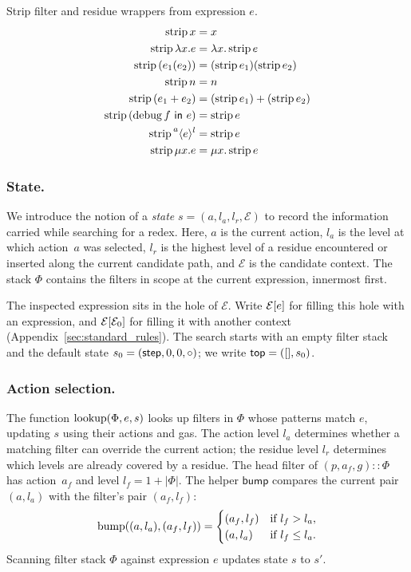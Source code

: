  Strip filter and residue wrappers from expression \(e\).
\[
  \begin{aligned}
    \Strip{x} &= x \\
    \Strip{\Lam{x}{e}} &= \Lam{x}{\Strip{e}} \\
    \Strip{(e_1(e_2))} &= (\Strip{e_1})(\Strip{e_2}) \\
    \Strip{\Nat{n}} &= \Nat{n} \\
    \Strip{(e_1 + e_2)} &= (\Strip{e_1}) + (\Strip{e_2}) \\
    \Strip{(\Filter{f}{e})} &= \Strip{e} \\
    \Strip{\Residue{a}{l}{e}} &= \Strip{e} \\
    \Strip{\Fix{x}{e}} &= \Fix{x}{\Strip{e}}
  \end{aligned}
\]

\subsubsection{State.} We introduce the notion of a \emph{state}
\(s=(a,l_a,l_r,\mathcal{E})\) to record the information carried
while searching for a redex. Here, \(a\) is the current
action, \(l_a\) is the level at which action~\(a\) was selected,
\(l_r\) is the highest level of a residue encountered or inserted
along the current candidate path, and \(\mathcal{E}\) is the
candidate context. The stack \(\Phi\) contains the filters in scope
at the current expression, innermost first.

The inspected expression sits in the hole of \(\mathcal{E}\).
Write \(\Plug{\mathcal{E}}{e}\) for filling this hole with an
expression, and \(\Plug{\mathcal{E}}{\mathcal{E}_0}\) for filling
it with another context (Appendix~\ref{sec:standard_rules}). The
search starts with an empty filter stack and the default state
\(s_0=(\ActStep,0,0,\Mark)\); we write
\(\TopState=([],s_0)\).

\subsubsection{Action selection.} The function
\(\Lookup{\Phi}{e}{s}\) looks up filters in \(\Phi\) whose patterns
match \(e\), updating \(s\) using their actions and gas.
The action level \(l_a\) determines whether a matching filter can
override the current action; the residue level \(l_r\) determines
which levels are already covered by a residue.
The head filter of \((p,a_f,g)::\Phi\) has
action~\(a_f\) and level \(l_f=1+|\Phi|\). The helper
\(\mathsf{bump}\) compares the current pair \((a,l_a)\) with the
filter's pair \((a_f,l_f)\):
\[
  \Bump{(a,l_a)}{(a_f,l_f)} =
  \begin{cases}
    (a_f,l_f) & \text{if } l_f>l_a,\\
    (a,l_a) & \text{if } l_f\leq l_a.
  \end{cases}
\]
Scanning filter stack \(\Phi\) against expression \(e\) updates
state \(s\) to \(s'\).

